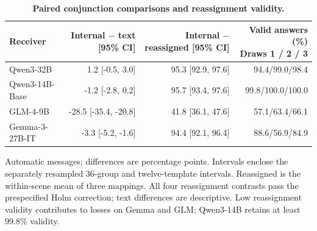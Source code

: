 \begin{table}[!htbp]
\caption{\textbf{Paired conjunction comparisons and reassignment validity.}}
\label{tab:wordif_conjunction_contrasts}
\centering\small
\setlength{\tabcolsep}{3pt}\renewcommand{\arraystretch}{1.12}
\begin{tabular*}{\linewidth}{@{\extracolsep{\fill}}lrrr@{}}
\toprule
Receiver & \shortstack[r]{Internal $-$ text\\{[95\% CI]}} & \shortstack[r]{Internal $-$ reassigned\\{[95\% CI]}} & \shortstack[r]{Valid answers (\%)\\Draws 1 / 2 / 3} \\
\midrule
Qwen3-32B & 1.2 [-0.5, 3.0] & 95.3 [92.9, 97.6] & 94.4/99.0/98.4 \\
Qwen3-14B-Base & -1.2 [-2.8, 0.2] & 95.7 [93.4, 97.6] & 99.8/100.0/100.0 \\
GLM-4-9B & -28.5 [-35.4, -20.8] & 41.8 [36.1, 47.6] & 57.1/63.4/66.1 \\
Gemma-3-27B-IT & -3.3 [-5.2, -1.6] & 94.4 [92.1, 96.4] & 88.6/56.9/84.9 \\
\bottomrule
\end{tabular*}
\par\vspace{3pt}
{\footnotesize\raggedright Automatic messages; differences are percentage points. Intervals enclose the separately resampled 36-group and twelve-template intervals. Reassigned is the within-scene mean of three mappings. All four reassignment contrasts pass the prespecified Holm correction; text differences are descriptive. Low reassignment validity contributes to losses on Gemma and GLM; Qwen3-14B retains at least 99.8\% validity.\par}
\end{table}

